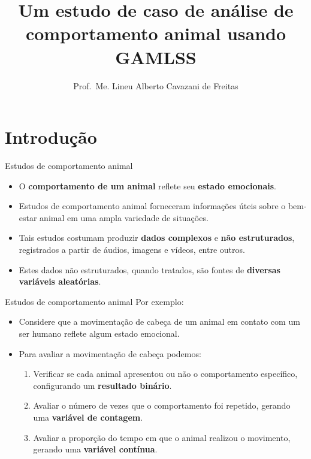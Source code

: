\documentclass[
  ignorenonframetext,
  serif,
  professionalfont,
  usenames,
  dvipsnames,
  aspectratio = 169]{beamer}
\title{\textbf{Um estudo de caso de análise de comportamento animal usando GAMLSS}}
\author{Prof.~Me. Lineu Alberto Cavazani de Freitas}
\date{}
\institute{Departamento de Estatística\\
Laboratório de Estatística e Geoinformação}
\begin{document}
\frame{\titlepage}

\hypertarget{introduuxe7uxe3o}{%
\section{Introdução}\label{introduuxe7uxe3o}}

\begin{frame}{Estudos de comportamento animal}
\protect\hypertarget{estudos-de-comportamento-animal}{}
\begin{itemize}
\item
  O \textbf{comportamento de um animal} reflete seu
  \textbf{estado emocionais}.
\item
  Estudos de comportamento animal forneceram informações úteis sobre o
  bem-estar animal em uma ampla variedade de situações.
\item
  Tais estudos costumam produzir \textbf{dados complexos} e
  \textbf{não estruturados}, registrados a partir de áudios, imagens e
  vídeos, entre outros.
\item
  Estes dados não estruturados, quando tratados, são fontes de
  \textbf{diversas variáveis aleatórias}.
\end{itemize}
\end{frame}

\begin{frame}{Estudos de comportamento animal}
\protect\hypertarget{estudos-de-comportamento-animal-1}{}
Por exemplo:

\begin{itemize}
\item
  Considere que a movimentação de cabeça de um animal em contato com um
  ser humano reflete algum estado emocional.
\item
  Para avaliar a movimentação de cabeça podemos:

  \begin{enumerate}
  \item
    Verificar se cada animal apresentou ou não o comportamento
    específico, configurando um \textbf{resultado binário}.
  \item
    Avaliar o número de vezes que o comportamento foi repetido, gerando
    uma \textbf{variável de contagem}.
  \item
    Avaliar a proporção do tempo em que o animal realizou o movimento,
    gerando uma \textbf{variável contínua}.
  \end{enumerate}
\end{itemize}
\end{frame}
\end{document}
